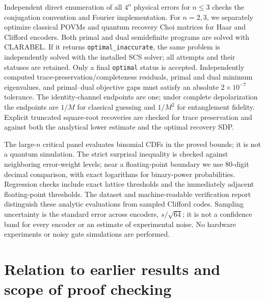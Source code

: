 \documentclass[aps,prl,onecolumn,superscriptaddress,amsmath,amssymb]{revtex4-2}
\begin{document}
Independent direct enumeration of all $4^n$ physical errors for $n\le3$ checks the conjugation convention and Fourier implementation. For $n=2,3$, we separately optimize classical POVMs and quantum recovery Choi matrices for Haar and Clifford encoders. Both primal and dual semidefinite programs are solved with CLARABEL. If it returns \texttt{optimal\_inaccurate}, the same problem is independently solved with the installed SCS solver; all attempts and their statuses are retained. Only a final \texttt{optimal} status is accepted. Independently computed trace-preservation/completeness residuals, primal and dual minimum eigenvalues, and primal--dual objective gaps must satisfy an absolute $2\times10^{-7}$ tolerance. The identity-channel endpoints are one; under complete depolarization the endpoints are $1/M$ for classical guessing and $1/M^2$ for entanglement fidelity. Explicit truncated square-root recoveries are checked for trace preservation and against both the analytical lower estimate and the optimal recovery SDP.

The large-$n$ critical panel evaluates binomial CDFs in the proved bounds; it is not a quantum simulation. The strict surprisal inequality is checked against neighboring error-weight levels; near a floating-point boundary we use 80-digit decimal comparison, with exact logarithms for binary-power probabilities. Regression checks include exact lattice thresholds and the immediately adjacent floating-point thresholds. The dataset and machine-readable verification report distinguish these analytic evaluations from sampled Clifford codes. Sampling uncertainty is the standard error across encoders, $s/\sqrt{64}$; it is not a confidence band for every encoder or an estimate of experimental noise. No hardware experiments or noisy gate simulations are performed.

\section{Relation to earlier results and scope of proof checking}
\end{document}
